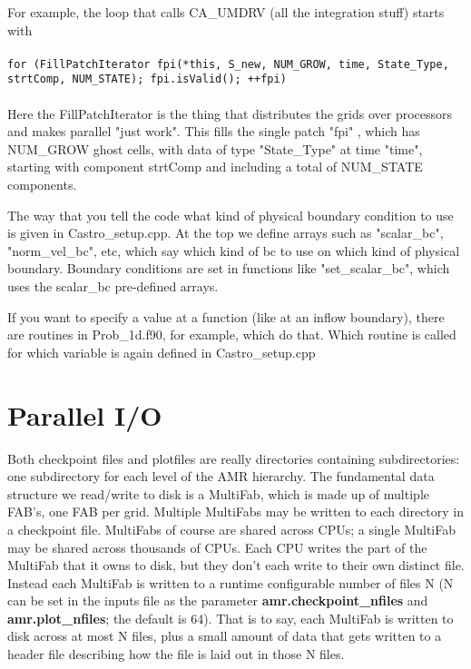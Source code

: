 For example, the loop that calls CA\_UMDRV (all the integration stuff) starts with \\ \\
{\tt       for (FillPatchIterator fpi(*this, S\_new, NUM\_GROW,
                                  time, State\_Type, strtComp, NUM\_STATE);
            fpi.isValid();
            ++fpi)
}\\ \\
Here the FillPatchIterator is the thing that distributes the grids over processors and 
makes parallel "just work". This fills the single patch "fpi" , which has NUM\_GROW 
ghost cells, with data of type "State\_Type" at time "time", starting with component 
strtComp and including a total of NUM\_STATE components.

The way that you tell the code what kind of physical boundary condition to use is given 
in Castro\_setup.cpp. At the top we define arrays such as "scalar\_bc", "norm\_vel\_bc", 
etc, which say which kind of bc to use on which kind of physical boundary. 
Boundary conditions are set in functions like "set\_scalar\_bc", which uses the 
scalar\_bc pre-defined arrays.

If you want to specify a value at a function (like at an inflow boundary), 
there are routines in Prob\_1d.f90, for example, which do that. Which routine is called 
for which variable is again defined in Castro\_setup.cpp 

\section{Parallel I/O}
Both checkpoint files and plotfiles are really directories containing subdirectories: 
one subdirectory for each level of the AMR hierarchy.  The fundamental data structure 
we read/write to disk is a MultiFab, which is made up of multiple FAB's, one FAB per grid.
Multiple MultiFabs may be written to each directory in a checkpoint file.  
MultiFabs of course are shared across CPUs; a single MultiFab may be 
shared across thousands of CPUs.  Each CPU writes the part of the MultiFab that it owns to disk, 
but they don't each write to their own distinct file.  Instead each MultiFab is written to a 
runtime configurable number of files N (N can be set in the inputs file as the
parameter {\bf amr.checkpoint\_nfiles} and {\bf amr.plot\_nfiles}; the default is 64).  
That is to say, each MultiFab is written to disk across at most N files, 
plus a small amount of data that gets written to a header file describing how the 
file is laid out in those N files.


